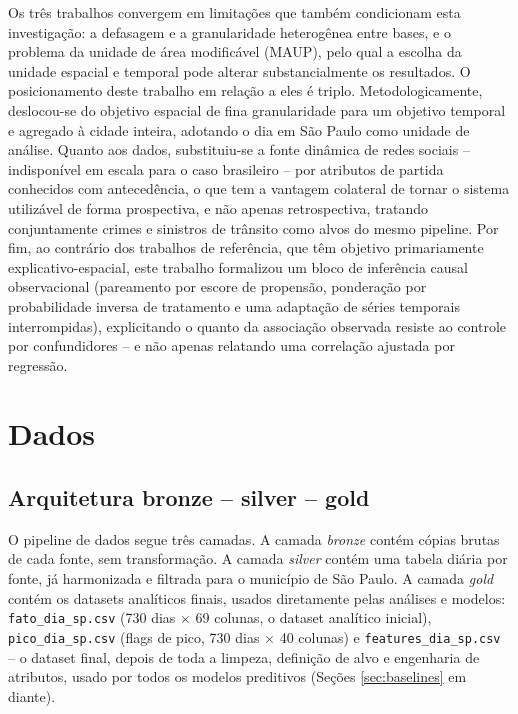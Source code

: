 \documentclass[12pt]{article}
\begin{document}
Os três trabalhos convergem em limitações que também condicionam esta
investigação: a defasagem e a granularidade heterogênea entre bases, e o
problema da unidade de área modificável (MAUP), pelo qual a escolha da
unidade espacial e temporal pode alterar substancialmente os resultados.
O posicionamento deste trabalho em relação a eles é triplo.
Metodologicamente, deslocou-se do objetivo espacial de fina granularidade
para um objetivo temporal e agregado à cidade inteira, adotando o dia em
São Paulo como unidade de análise. Quanto aos dados, substituiu-se a
fonte dinâmica de redes sociais -- indisponível em escala para o caso
brasileiro -- por atributos de partida conhecidos com antecedência, o que
tem a vantagem colateral de tornar o sistema utilizável de forma
prospectiva, e não apenas retrospectiva, tratando conjuntamente crimes e
sinistros de trânsito como alvos do mesmo pipeline. Por fim, ao contrário
dos trabalhos de referência, que têm objetivo primariamente
explicativo-espacial, este trabalho formalizou um bloco de inferência
causal observacional (pareamento por escore de propensão, ponderação por
probabilidade inversa de tratamento e uma adaptação de séries temporais
interrompidas), explicitando o quanto da associação observada resiste ao
controle por confundidores -- e não apenas relatando uma correlação
ajustada por regressão.

\section{Dados}
\label{sec:dados}

\subsection{Arquitetura bronze -- silver -- gold}

O pipeline de dados segue três camadas. A camada \emph{bronze} contém
cópias brutas de cada fonte, sem transformação. A camada \emph{silver}
contém uma tabela diária por fonte, já harmonizada e filtrada para o
município de São Paulo. A camada \emph{gold} contém os datasets
analíticos finais, usados diretamente pelas análises e modelos:
\texttt{fato\_dia\_sp.csv} (730 dias $\times$ 69 colunas, o dataset
analítico inicial), \texttt{pico\_dia\_sp.csv} (flags de pico, 730 dias
$\times$ 40 colunas) e \texttt{features\_dia\_sp.csv} -- o dataset final,
depois de toda a limpeza, definição de alvo e engenharia de atributos,
usado por todos os modelos preditivos (Seções \ref{sec:baselines} em
diante).
\end{document}
